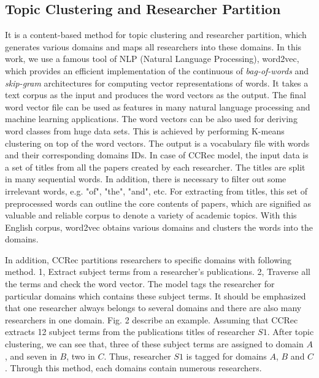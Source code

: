 \documentclass[review]{elsarticle}
\begin{document}
\subsection{Topic Clustering and Researcher Partition}
It is a content-based method for topic clustering and researcher partition, which generates various domains and maps all researchers into these domains. In this work, we use a famous tool of NLP (Natural Language Processing), word2vec, which provides an efficient implementation of the continuous of \emph{bag-of-words} and \emph{skip-gram} architectures for computing vector representations of words. It takes a text corpus as the input and produces the word vectors as the output. The final word vector file can be used as features in many natural language processing and machine learning applications. The word vectors can be also used for deriving word classes from huge data sets. This is achieved by performing K-means clustering on top of the word vectors. The output is a vocabulary file with words and their corresponding domains IDs. In case of CCRec model, the input data is a set of titles from all the papers created by each researcher. The titles are split in many sequential words. In addition, there is necessary to filter out some irrelevant words, e.g. "of", "the", "and", etc. For extracting from titles, this set of preprocessed words can outline the core contents of papers, which are signified as valuable and reliable corpus to denote a variety of academic topics. With this English corpus, word2vec obtains various domains and clusters the words into the domains.

In addition, CCRec partitions researchers to specific domains with following method. 1, Extract subject terms from a researcher's publications. 2, Traverse all the terms and check the word vector. The model tags the researcher for particular domains which contains these subject terms. It should be emphasized that one researcher always belongs to several domains and there are also many researchers in one domain. Fig. 2 describe an example. Assuming that CCRec extracts 12 subject terms from the publications titles of researcher $S1$. After topic clustering, we can see that, three of these subject terms are assigned to domain $A$, and seven in $B$, two in $C$. Thus, researcher $S1$ is tagged for domains $A$, $B$ and $C$. Through this method, each domains contain numerous researchers.
\end{document}
